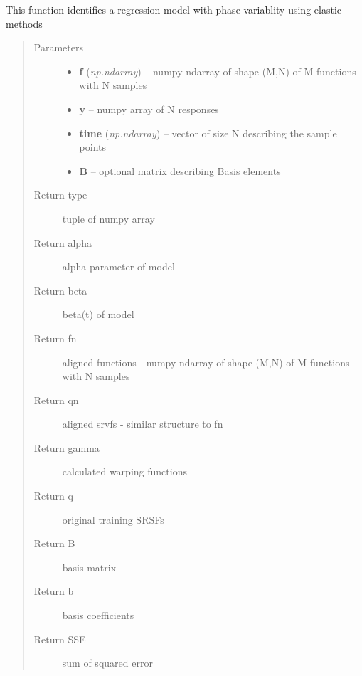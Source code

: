 \documentclass[letterpaper,10pt,english]{sphinxmanual}
\begin{document}
\begin{fulllineitems}
\label{regression:regression.elastic_regression}
This function identifies a regression model with phase-variablity using elastic methods
\begin{quote}\begin{description}
\item[{Parameters}] \leavevmode\begin{itemize}
\item {} 
\textbf{f} (\emph{np.ndarray}) -- numpy ndarray of shape (M,N) of M functions with N samples

\item {} 
\textbf{y} -- numpy array of N responses

\item {} 
\textbf{time} (\emph{np.ndarray}) -- vector of size N describing the sample points

\item {} 
\textbf{B} -- optional matrix describing Basis elements

\end{itemize}

\item[{Return type}] \leavevmode
tuple of numpy array

\item[{Return alpha}] \leavevmode
alpha parameter of model

\item[{Return beta}] \leavevmode
beta(t) of model

\item[{Return fn}] \leavevmode
aligned functions - numpy ndarray of shape (M,N) of M functions with N samples

\item[{Return qn}] \leavevmode
aligned srvfs - similar structure to fn

\item[{Return gamma}] \leavevmode
calculated warping functions

\item[{Return q}] \leavevmode
original training SRSFs

\item[{Return B}] \leavevmode
basis matrix

\item[{Return b}] \leavevmode
basis coefficients

\item[{Return SSE}] \leavevmode
sum of squared error

\end{description}\end{quote}

\end{fulllineitems}
\end{document}
